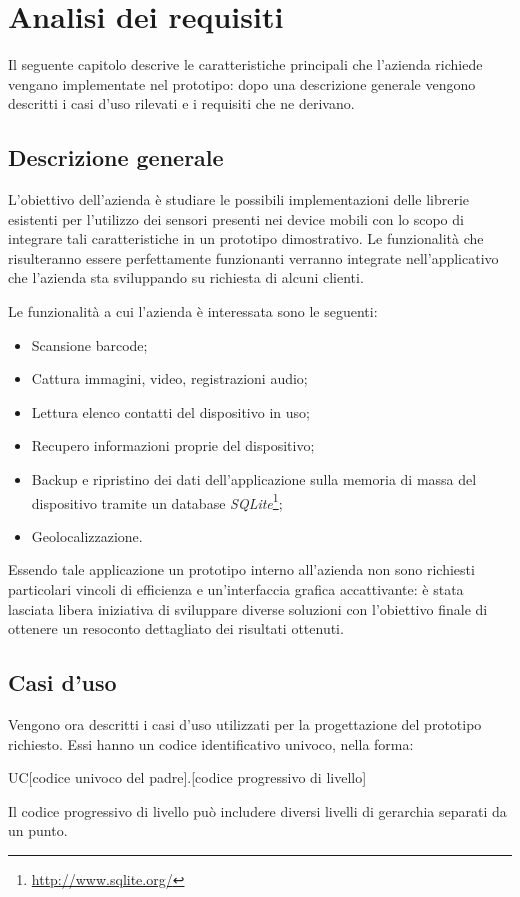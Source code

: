 \chapter{Analisi dei requisiti}\label{ch:requisiti}
Il seguente capitolo descrive le caratteristiche principali che l'azienda \myCompany richiede vengano implementate nel prototipo: dopo una descrizione generale vengono descritti i casi d'uso rilevati e i requisiti che ne derivano.

\section{Descrizione generale}
L'obiettivo dell'azienda è studiare le possibili implementazioni delle librerie esistenti per l'utilizzo dei sensori presenti nei device mobili con lo scopo di integrare tali caratteristiche in un prototipo dimostrativo.
Le funzionalità che risulteranno essere perfettamente funzionanti verranno integrate nell'applicativo che l'azienda sta sviluppando su richiesta di alcuni clienti.

Le funzionalità a cui l'azienda è interessata sono le seguenti:
\begin{itemize}
\item Scansione barcode;
\item Cattura immagini, video, registrazioni audio;
\item Lettura elenco contatti del dispositivo in uso;
\item Recupero informazioni proprie del dispositivo;
\item Backup e ripristino dei dati dell'applicazione sulla memoria di massa del dispositivo tramite un database \emph{SQLite}\footnote{\url{http://www.sqlite.org/}};
\item Geolocalizzazione.
\end{itemize}

Essendo tale applicazione un prototipo interno all'azienda non sono richiesti particolari vincoli di efficienza e un'interfaccia grafica accattivante: è stata lasciata libera iniziativa di sviluppare diverse soluzioni con l'obiettivo finale di ottenere un resoconto dettagliato dei risultati ottenuti.

\section{Casi d'uso}
Vengono ora descritti i casi d'uso utilizzati per la progettazione del prototipo richiesto.
Essi hanno un codice identificativo univoco, nella forma:
\begin{center}
UC[codice univoco del padre].[codice progressivo di livello]
\end{center}
Il codice progressivo di livello può includere diversi livelli di gerarchia separati da un punto.

